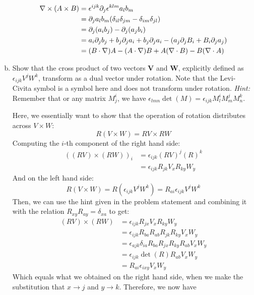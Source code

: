 \documentclass[10pt]{article}
\begin{document}
\begin{enumerate}[(a)]
\begin{solution}
            \begin{align*}
                \nabla \times (A \times B) &= \epsilon^{ijk}\partial_j \epsilon^{klm}a_l b_m\\
                &= \partial_j a_l b_m (\delta_{il}\delta_{jm} - \delta_{im}\delta_{jl})\\
                &= \partial_j (a_ib_j) - \partial_j(a_jb_i)\\
                &= a_i \partial_j b_j + b_j \partial_j a_i + b_j \partial_j a_i - (a_j \partial_j B_i + B_i \partial_j a_j)\\
                &= (B \cdot \nabla)A - (A \cdot \nabla)B + A(\nabla \cdot B) - B(\nabla \cdot A)
            \end{align*}
        \end{solution}
        \item Show that the cross product of two vectors $\mathbf V$ and $\mathbf W$, explicitly defined as $\epsilon_{ijk} V^jW^k$, transform as a dual vector under rotation. Note that the Levi-Civita symbol is a symbol here and does not transform under rotation. \textit{Hint:} Remember that or any matrix $M^i_j$, we have $\epsilon_{lmn} \det(M) = \epsilon_{ijk} M^i_lM^j_mM^k_n$.
        
        \begin{solution}
            Here, we essentially want to show that the operation of rotation distributes across $V \times W$:
               \[ R(V \times W) = RV \times RW\]
            Computing the $i$-th component of the right hand side:
            \begin{align*}
            ((RV)\times(RW))_{i} &= \epsilon_{ijk}(RV)^{j}(R)^{k}\\
            &=\epsilon_{ijk}R_{jk}V_xR_{ky}W_y
            \end{align*}
            And on the left hand side:
            $$R(V\times W)=R(\epsilon_{ijk}V^jW^k)=R_{ai}\epsilon_{ijk}V^jW^k$$
            Then, we can use the hint given in the problem statement and combining it with the relation $R_{xy}R_{ay}=\delta_{xa}$ to get:
            \begin{align*}
                (RV)\times(RW) &= \epsilon_{ijk}R_{jx}V_xR_{ky}W_y\\
                &= \epsilon_{ijk}R_{ba}R_{ab}R_{jk}R_{ky}V_xW_y \\
                &= \epsilon_{ajk}\delta_{ia}R_{ba}R_{jx}R_{ky}R_{ab}V_xW_y\\
                &= \epsilon_{ijk}\det(R)R_{ab}V_xW_y \\
                &= R_{ai}\epsilon_{ixy}V_xW_y
            \end{align*}
            Which equals what we obtained on the right hand side, when we make the substitution that $x \to j$ and $y \to k$. Therefore, we now have 


\end{solution}
\end{enumerate}
\end{document}
